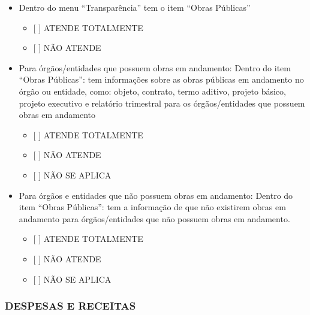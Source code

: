 \documentclass[]{book}
\providecommand{\tightlist}{%
  \setlength{\itemsep}{0pt}\setlength{\parskip}{0pt}}
\begin{document}
\begin{itemize}
\tightlist
\item
  Dentro do menu ``Transparência'' tem o item ``Obras Públicas''

  \begin{itemize}
  \tightlist
  \item
    {[} {]} ATENDE TOTALMENTE
  \item
    {[} {]} NÃO ATENDE
  \end{itemize}
\item
  Para órgãos/entidades que possuem obras em andamento: Dentro do item ``Obras Públicas'': tem informações sobre as obras públicas em andamento no órgão ou entidade, como: objeto, contrato, termo aditivo, projeto básico, projeto executivo e relatório trimestral para os órgãos/entidades que possuem obras em andamento

  \begin{itemize}
  \tightlist
  \item
    {[} {]} ATENDE TOTALMENTE
  \item
    {[} {]} NÃO ATENDE
  \item
    {[} {]} NÃO SE APLICA
  \end{itemize}
\item
  Para órgãos e entidades que não possuem obras em andamento: Dentro do item ``Obras Públicas'': tem a informação de que não existirem obras em andamento para órgãos/entidades que não possuem obras em andamento.

  \begin{itemize}
  \tightlist
  \item
    {[} {]} ATENDE TOTALMENTE
  \item
    {[} {]} NÃO ATENDE
  \item
    {[} {]} NÃO SE APLICA
  \end{itemize}
\end{itemize}

\hypertarget{despesas-e-receitas-1}{%
\subsubsection*{DESPESAS E RECEITAS}\label{despesas-e-receitas-1}}
\end{document}
